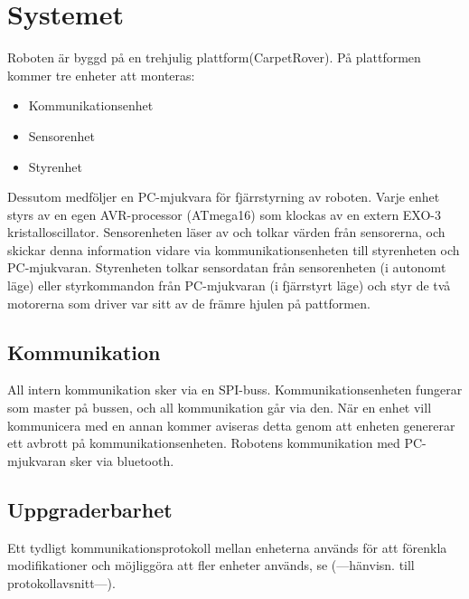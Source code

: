 %

\section{Systemet}

Roboten är byggd på en trehjulig plattform(CarpetRover). På plattformen kommer tre enheter att monteras:
\begin{itemize}
        \item Kommunikationsenhet
        \item Sensorenhet
        \item Styrenhet
\end{itemize}
Dessutom medföljer en PC-mjukvara för fjärrstyrning av roboten. 
Varje enhet  styrs av en egen AVR-processor (ATmega16) som klockas av en extern EXO-3 kristalloscillator. Sensorenheten läser av och tolkar värden från sensorerna, och skickar denna information vidare via kommunikationsenheten till styrenheten och PC-mjukvaran. Styrenheten tolkar sensordatan från sensorenheten (i autonomt läge) eller styrkommandon från PC-mjukvaran (i fjärrstyrt läge) och styr de två motorerna som driver var sitt av de främre hjulen på pattformen.   

\subsection{Kommunikation}
All intern kommunikation sker via en SPI-buss. Kommunikationsenheten fungerar som master på bussen, och all kommunikation går via den. När en enhet vill kommunicera med en annan kommer aviseras detta genom att enheten genererar ett avbrott på kommunikationsenheten. 
Robotens kommunikation med PC-mjukvaran sker via bluetooth.

\subsection{Uppgraderbarhet}
Ett tydligt kommunikationsprotokoll mellan enheterna används för att förenkla modifikationer och möjliggöra att fler enheter används, se (---hänvisn. till protokollavsnitt---).
